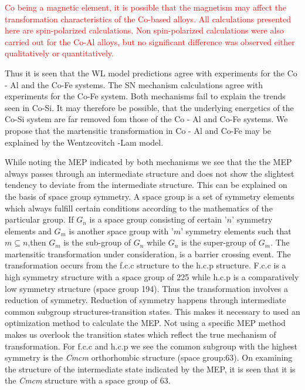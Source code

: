 \documentclass[preprint]{elsarticle}
\begin{document}
\textcolor{red}{Co being a magnetic element, it is possible that the magnetism may affect the transformation characteristics of the Co-based alloys. All calculations presented here are spin-polarized calculations. Non spin-polarized calculations were also carried out for the Co-Al alloys, but no significant difference was observed either qualitatively or quantitatively.}

Thus it is seen that the WL model predictions agree with experiments for the Co - Al and the Co-Fe systems. The SN mechanism calculations agree with experiments for the  Co-Fe system. Both mechanisms fail to explain the trends seen in Co-Si. It may therefore be possible, that the underlying energetics of the Co-Si system are far removed fom those of the Co - Al and Co-Fe systems. We propose that the martensitic transformation  in  Co - Al and Co-Fe may be explained by the Wentzcovitch -Lam  model.

While noting the MEP indicated by both mechanisms we see that the the MEP always passes through an intermediate structure and does not show the slightest tendency to deviate from the
intermediate structure. This can be explained on the basis of space group symmetry. A space group is a set of symmetry elements which always fulfill
certain conditions according to the mathematics of the particular group. If $G_n$ is a space group consisting of certain ’$n$’ symmetry
elements and $G_m$ is another space group with ’$m$’ symmetry elements such that $m \subseteq n$,then $G_m$ is the sub-group of $G_n$ while $G_n$ is the super-group of $G_m$. The martensitic 
transformation under consideration, is a barrier crossing event.  The transformation occurs from  the f.c.c structure to the h.c.p structure. F.c.c is a high symmetry structure with a space group
of 225 while h.c.p is a comparatively low symmetry structure (space group 194). Thus the transformation involves a reduction of symmetry. Reduction of symmetry happens through intermediate
common subgroup structures-transition states. This makes it necessary to used an optimization method to calculate the MEP. Not using a specific MEP method makes us overlook the
transition states which reflect the true mechanism of transformation. For f.c.c and h.c.p we see the common subgroup with the highest symmetry is the \textit{Cmcm} orthorhombic 
structure (space group:63). On examining the structure of the intermediate state indicated by the MEP, it is seen that it is the \textit{Cmcm} structure with a space group of 63.
\end{document}
